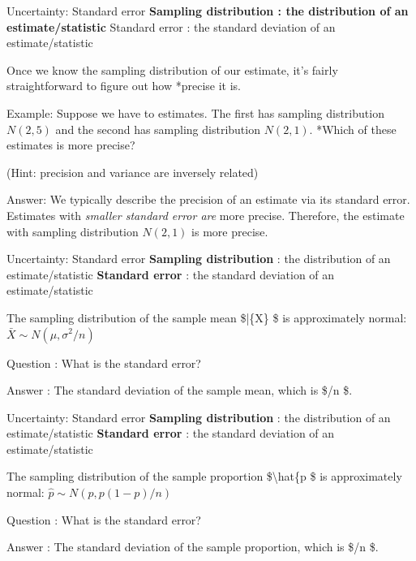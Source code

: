 \documentclass[
  ignorenonframetext,
]{beamer}
\begin{document}
\begin{frame}{Uncertainty: Standard error}
\protect\hypertarget{uncertainty-standard-error}{}
\textbf{Sampling distribution : the distribution of an
estimate/statistic }Standard error : the standard deviation of an
estimate/statistic

Once we know the sampling distribution of our estimate, it's fairly
straightforward to figure out how *precise it is.

Example: Suppose we have to estimates. The first has sampling
distribution \(N(2, 5)\) and the second has sampling distribution
\(N(2, 1)\). *Which of these estimates is more precise?

\small (Hint: precision and variance are inversely related) \pause

\normalsize Answer: We typically describe the precision of an estimate
via its standard error. Estimates with \emph{smaller standard error are
}more precise. Therefore, the estimate with sampling distribution
\(N(2, 1)\) is more precise.
\end{frame}

\begin{frame}{Uncertainty: Standard error}
\protect\hypertarget{uncertainty-standard-error-1}{}
\textbf{Sampling distribution} : the distribution of an
estimate/statistic \textbf{Standard error} : the standard deviation of
an estimate/statistic

The sampling distribution of the sample mean \$\bar\{X\} \$ is
approximately normal: \(\bar{X } \sim N(\mu, \sigma^2/n)\)

Question : What is the standard error?

Answer : The standard deviation of the sample mean, which is
\$/n \$.
\end{frame}

\begin{frame}{Uncertainty: Standard error}
\protect\hypertarget{uncertainty-standard-error-2}{}
\textbf{Sampling distribution} : the distribution of an
estimate/statistic \textbf{Standard error} : the standard deviation of
an estimate/statistic

The sampling distribution of the sample proportion
\$\textbackslash hat\{p \$ is approximately normal:
\(\hat{p} \sim N(p, p(1-p)/n)\)

Question : What is the standard error?

Answer : The standard deviation of the sample proportion, which is
\$/n \$.
\end{frame}
\end{document}
